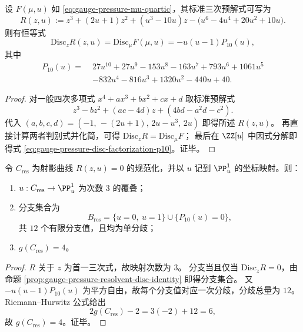 \begin{proposition}[三次预解式与判别式恒等]\label{prop:gauge-pressure-resolvent-disc-identity}
设 \(F(\mu,u)\) 如 \eqref{eq:gauge-pressure-mu-quartic}，其标准三次预解式可写为
\[
R(z,u):=z^3+(2u+1)z^2+(u^3-10u)z-\bigl(u^6-4u^4+20u^2+10u\bigr).
\]
则有恒等式
\begin{equation}\label{eq:gauge-pressure-disc-factorization-p10}
\mathrm{Disc}_{z}R(z,u)=\mathrm{Disc}_{\mu}F(\mu,u)=-u(u-1)P_{10}(u),
\end{equation}
其中
\[
\begin{aligned}
P_{10}(u)=\;&27u^{10}+27u^9-153u^8-163u^7+793u^6+1061u^5\\
&-832u^4-816u^3+1320u^2-440u+40.
\end{aligned}
\]
\end{proposition}
\begin{proof}
对一般四次多项式 \(x^4+ax^3+bx^2+cx+d\) 取标准预解式
\[
z^3-bz^2+(ac-4d)z+(4bd-a^2d-c^2).
\]
代入
\(
(a,b,c,d)=(-1,\,-(2u+1),\,2u-u^3,\,2u)
\)
即得所述 \(R(z,u)\)。
再直接计算两者判别式并化简，可得
\(
\mathrm{Disc}_{z}R=\mathrm{Disc}_{\mu}F
\)；
最后在 \(\ZZ[u]\) 中因式分解即得式 \eqref{eq:gauge-pressure-disc-factorization-p10}。证毕。
\end{proof}

\begin{theorem}[预解式三次覆叠的规范化属]\label{thm:gauge-pressure-resolvent-cover-genus4}
令 \(C_{\mathrm{res}}\) 为射影曲线 \(R(z,u)=0\) 的规范化，并以 \(u\) 记到 \(\PP^1_u\) 的坐标映射。则：
\begin{enumerate}
  \item \(u:C_{\mathrm{res}}\to \PP^1_u\) 为次数 \(3\) 的覆叠；
  \item 分支集合为
  \[
  B_{\mathrm{res}}=\{u=0,\ u=1\}\cup\{P_{10}(u)=0\},
  \]
  共 \(12\) 个有限分支值，且均为单分歧；
  \item \(g(C_{\mathrm{res}})=4\)。
\end{enumerate}
\end{theorem}
\begin{proof}
\(R\) 关于 \(z\) 为首一三次式，故映射次数为 \(3\)。
分支当且仅当 \(\mathrm{Disc}_z R=0\)，由命题 \ref{prop:gauge-pressure-resolvent-disc-identity} 即得分支集合。
又 \(-u(u-1)P_{10}(u)\) 为平方自由，故每个分支值对应一次分歧，分歧总量为 \(12\)。
Riemann--Hurwitz 公式给出
\[
2g(C_{\mathrm{res}})-2=3(-2)+12=6,
\]
故 \(g(C_{\mathrm{res}})=4\)。证毕。
\end{proof}

